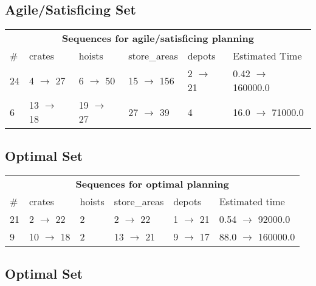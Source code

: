 \documentclass{article}
\begin{document}
                         \subsection*{Agile/Satisficing Set}

                        \begin{center}
                        \begin{tabular}{l|l|l|l|l|l}
                        \multicolumn{6}{c}{\bf \large Sequences for agile/satisficing planning}\\
                        \# & crates & hoists & store\_areas & depots & Estimated Time\\\midrule
                        24&4 $\rightarrow$ 27&6 $\rightarrow$ 50&15 $\rightarrow$ 156&2 $\rightarrow$ 21&0.42 $\rightarrow$ 160000.0\\
6&13 $\rightarrow$ 18&19 $\rightarrow$ 27&27 $\rightarrow$ 39&4&16.0 $\rightarrow$ 71000.0
                        \end{tabular}
                        \end{center}
                    
                            \subsection*{Optimal Set}

                            \begin{center}
                            \begin{tabular}{l|l|l|l|l|l}
                            \multicolumn{6}{c}{\bf \large Sequences for optimal planning}\\
                            \# & crates & hoists & store\_areas & depots & Estimated time\\\midrule
                            21&2 $\rightarrow$ 22&2&2 $\rightarrow$ 22&1 $\rightarrow$ 21&0.54 $\rightarrow$ 92000.0\\
9&10 $\rightarrow$ 18&2&13 $\rightarrow$ 21&9 $\rightarrow$ 17&88.0 $\rightarrow$ 160000.0
                            \end{tabular}
                            \end{center}
                    
                                \subsection*{Optimal Set}
                                
\end{document}
